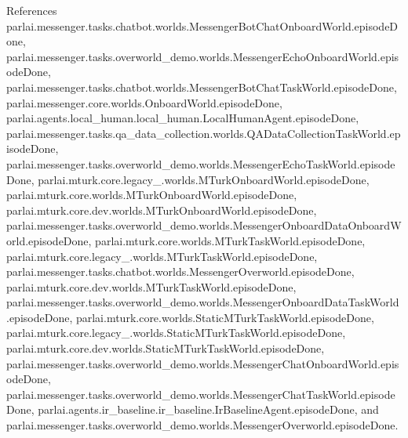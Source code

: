 References parlai.\+messenger.\+tasks.\+chatbot.\+worlds.\+Messenger\+Bot\+Chat\+Onboard\+World.\+episode\+Done, parlai.\+messenger.\+tasks.\+overworld\+\_\+demo.\+worlds.\+Messenger\+Echo\+Onboard\+World.\+episode\+Done, parlai.\+messenger.\+tasks.\+chatbot.\+worlds.\+Messenger\+Bot\+Chat\+Task\+World.\+episode\+Done, parlai.\+messenger.\+core.\+worlds.\+Onboard\+World.\+episode\+Done, parlai.\+agents.\+local\+\_\+human.\+local\+\_\+human.\+Local\+Human\+Agent.\+episode\+Done, parlai.\+messenger.\+tasks.\+qa\+\_\+data\+\_\+collection.\+worlds.\+Q\+A\+Data\+Collection\+Task\+World.\+episode\+Done, parlai.\+messenger.\+tasks.\+overworld\+\_\+demo.\+worlds.\+Messenger\+Echo\+Task\+World.\+episode\+Done, parlai.\+mturk.\+core.\+legacy\+\_.\+worlds.\+M\+Turk\+Onboard\+World.\+episode\+Done, parlai.\+mturk.\+core.\+worlds.\+M\+Turk\+Onboard\+World.\+episode\+Done, parlai.\+mturk.\+core.\+dev.\+worlds.\+M\+Turk\+Onboard\+World.\+episode\+Done, parlai.\+messenger.\+tasks.\+overworld\+\_\+demo.\+worlds.\+Messenger\+Onboard\+Data\+Onboard\+World.\+episode\+Done, parlai.\+mturk.\+core.\+worlds.\+M\+Turk\+Task\+World.\+episode\+Done, parlai.\+mturk.\+core.\+legacy\+\_.\+worlds.\+M\+Turk\+Task\+World.\+episode\+Done, parlai.\+messenger.\+tasks.\+chatbot.\+worlds.\+Messenger\+Overworld.\+episode\+Done, parlai.\+mturk.\+core.\+dev.\+worlds.\+M\+Turk\+Task\+World.\+episode\+Done, parlai.\+messenger.\+tasks.\+overworld\+\_\+demo.\+worlds.\+Messenger\+Onboard\+Data\+Task\+World.\+episode\+Done, parlai.\+mturk.\+core.\+worlds.\+Static\+M\+Turk\+Task\+World.\+episode\+Done, parlai.\+mturk.\+core.\+legacy\+\_.\+worlds.\+Static\+M\+Turk\+Task\+World.\+episode\+Done, parlai.\+mturk.\+core.\+dev.\+worlds.\+Static\+M\+Turk\+Task\+World.\+episode\+Done, parlai.\+messenger.\+tasks.\+overworld\+\_\+demo.\+worlds.\+Messenger\+Chat\+Onboard\+World.\+episode\+Done, parlai.\+messenger.\+tasks.\+overworld\+\_\+demo.\+worlds.\+Messenger\+Chat\+Task\+World.\+episode\+Done, parlai.\+agents.\+ir\+\_\+baseline.\+ir\+\_\+baseline.\+Ir\+Baseline\+Agent.\+episode\+Done, and parlai.\+messenger.\+tasks.\+overworld\+\_\+demo.\+worlds.\+Messenger\+Overworld.\+episode\+Done.

\mbox{\label{classparlai_1_1mturk_1_1core_1_1worlds_1_1StaticMTurkTaskWorld_a83e09ea1d4ae320941d72b7c72897d3b}} 
